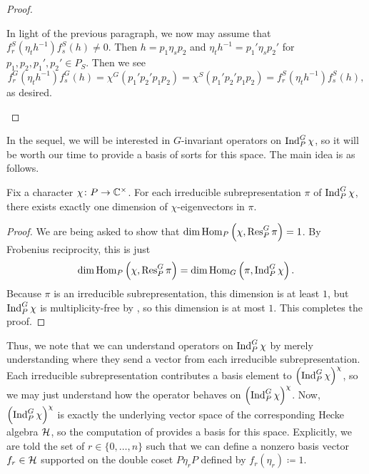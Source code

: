 \begin{proof}
\begin{itemize}
        In light of the previous paragraph, we now may assume that $f_r^S\left(\eta_th^{-1}\right)f_s^S(h)\ne0$. Then $h=p_1\eta_sp_2$ and $\eta_th^{-1}=p_1'\eta_sp_2'$ for $p_1,p_2,p_1',p_2'\in P_S$. Then we see
        \[f_r^G\left(\eta_th^{-1}\right)f_s^G(h)=\chi^G(p_1'p_2'p_1p_2)=\chi^S(p_1'p_2'p_1p_2)=f_r^S\left(\eta_th^{-1}\right)f_s^S(h),\]
        as desired.
        \qedhere
    \end{itemize}
\end{proof}
In the sequel, we will be interested in $G$-invariant operators on $\operatorname{Ind}^G_P\chi$, so it will be worth our time to provide a basis of sorts for this space. The main idea is as follows.
\begin{lemma} \label{lem:basis-of-ind}
	Fix a character $\chi\colon P\to\mathbb C^\times$. For each irreducible subrepresentation $\pi$ of $\operatorname{Ind}^G_P\chi$, there exists exactly one dimension of $\chi$-eigenvectors in $\pi$.
\end{lemma}
\begin{proof}
	We are being asked to show that $\dim\operatorname{Hom}_P\left(\chi,\operatorname{Res}^G_P\pi\right)=1$. By Frobenius reciprocity, this is just
	\[\dim\operatorname{Hom}_P\left(\chi,\operatorname{Res}^G_P\pi\right)=\dim\operatorname{Hom}_G\left(\pi,\operatorname{Ind}_P^G\chi\right).\]
	Because $\pi$ is an irreducible subrepresentation, this dimension is at least $1$, but $\operatorname{Ind}_P^G\chi$ is multiplicity-free by , so this dimension is at most $1$. This completes the proof.
\end{proof}
Thus, we note that we can understand operators on $\operatorname{Ind}^G_P\chi$ by merely understanding where they send a vector from each irreducible subrepresentation. Each irreducible subrepresentation contributes a basis element to $\left(\operatorname{Ind}^G_P\chi\right)^\chi$, so we may just understand how the operator behaves on $\left(\operatorname{Ind}^G_P\chi\right)^\chi$. Now, $\left(\operatorname{Ind}^G_P\chi\right)^\chi$ is exactly the underlying vector space of the corresponding Hecke algebra $\mathcal{H}$, so the computation of  provides a basis for this space. Explicitly, we are told the set of $r\in\{0,\ldots,n\}$ such that we can define a nonzero basis vector $f_r\in\mathcal{H}$ supported on the double coset $P\eta_rP$ defined by $f_r(\eta_r)\coloneqq1$.


